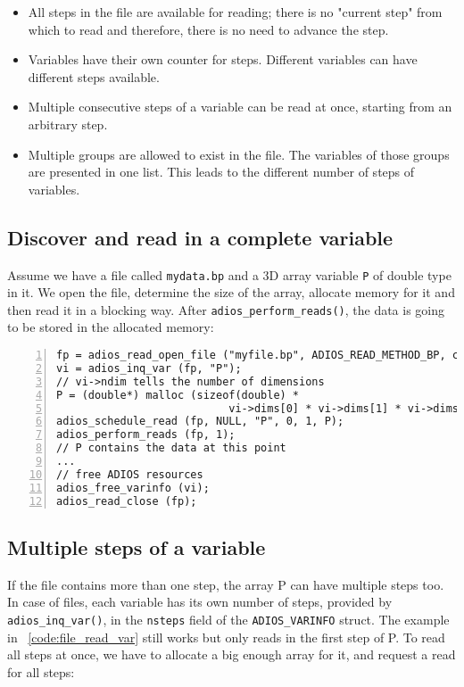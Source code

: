   \begin{itemize}
  \item All steps in the file are available for reading; there is no "current step" from which to read and therefore, there is no need to advance the step.
  \item Variables have their own counter for steps. Different variables can have different steps available.
  \item Multiple consecutive steps of a variable can be read at once, starting from an arbitrary step.
  \item Multiple groups are allowed to exist in the file. The variables of those groups are presented in one list. This leads to the different number of steps of variables.
  \end{itemize}


\subsection{Discover and read in a complete variable}
Assume we have a file called \verb+mydata.bp+ and a 3D array variable \verb+P+ of double type in it. We open the file, determine the size of the array, allocate memory for it and then read it in a blocking way. After \verb+adios_perform_reads()+,  the data is going to be stored in the allocated memory:

\begin{lstlisting}[numbers=left, numberstyle=\color{gray}, stepnumber=2,
                             caption={Read a complete array from a file}, label=code:file_read_var]
fp = adios_read_open_file ("myfile.bp", ADIOS_READ_METHOD_BP, comm);
vi = adios_inq_var (fp, "P");
// vi->ndim tells the number of dimensions
P = (double*) malloc (sizeof(double) * 
                           vi->dims[0] * vi->dims[1] * vi->dims[2]);
adios_schedule_read (fp, NULL, "P", 0, 1, P);
adios_perform_reads (fp, 1);   
// P contains the data at this point
...
// free ADIOS resources
adios_free_varinfo (vi); 
adios_read_close (fp);
\end{lstlisting}


\subsection{Multiple steps of a variable}
 If the file contains more than one step, the array P can have multiple steps too. In case of files, each variable has its own number of steps, provided by \verb+adios_inq_var()+, in the \verb+nsteps+ field of the \verb+ADIOS_VARINFO+ struct. The example in \lstlistingname~\ref{code:file_read_var} still works but only reads in the first step of P. To read all steps at once, we have to allocate a big enough array for it, and request a read for all steps:

